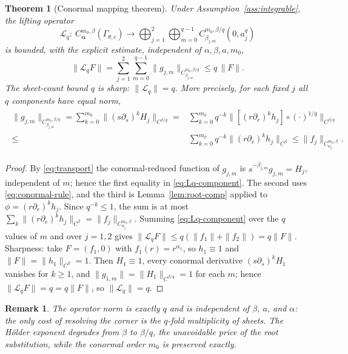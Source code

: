 \documentclass[pdflatex,sn-mathphys-num]{sn-jnl}%
\newcommand{\Gw}{\Gamma_{\theta,c}}
\newcommand{\bd}{\boldsymbol}
\newcommand{\Lq}{\mathcal{L}_{q}}
\theoremstyle{thmstyleone}
\newtheorem{theorem}{Theorem}
\theoremstyle{thmstyletwo}
\newtheorem{remark}{Remark}
\theoremstyle{thmstylethree}
\begin{document}
\begin{theorem}[Conormal mapping theorem]\label{thm:Lq-bounded}
Under Assumption~\ref{ass:integrable}, the lifting operator
\[
  \Lq:\ C^{m_0,\beta}_{\bd\alpha}(\Gw)
  \longrightarrow
  \bigoplus_{j=1}^{2}\bigoplus_{m=0}^{q-1}
     C^{m_0,\beta/q}_{\beta_{j,m}}(0,a_j^{q})
\]
is bounded, with the explicit estimate, independent of $\alpha,\beta,a,m_0$,
\begin{equation}\label{eq:Lq-bound}
  \|\Lq F\|
  =\sum_{j=1}^{2}\sum_{m=0}^{q-1}\|g_{j,m}\|_{C^{m_0,\beta/q}_{\beta_{j,m}}}
  \le q\,\|F\| .
\end{equation}
The sheet-count bound $q$ is sharp: $\|\Lq\|=q$.
More precisely, for each fixed $j$ all $q$ components have equal norm,
\begin{align}\label{eq:Lq-component}
\begin{aligned}
  \|g_{j,m}\|_{C^{m_0,\beta/q}_{\beta_{j,m}}}
  =\sum_{k=0}^{m_0}\bigl\|(s\partial_s)^{k}H_j\bigr\|_{C^{\beta/q}}
  =&\sum_{k=0}^{m_0}q^{-k}\bigl\|[(r\partial_r)^{k}h_j]\circ(\cdot)^{1/q}\bigr\|_{C^{\beta/q}} \\
  \le&\sum_{k=0}^{m_0}q^{-k}\bigl\|(r\partial_r)^{k}h_j\bigr\|_{C^{\beta}}
  \le\|f_j\|_{C^{m_0,\beta}_{\alpha_j}} .
\end{aligned}
\end{align}
\end{theorem}

\begin{proof}
By \eqref{eq:transport} the conormal-reduced function of $g_{j,m}$ is
$s^{-\beta_{j,m}}g_{j,m}=H_j$, independent of $m$; hence the first equality in
\eqref{eq:Lq-component}. The second uses \eqref{eq:conormal-rule}, and the third
is Lemma~\ref{lem:root-comp} applied to $\phi=(r\partial_r)^{k}h_j$. Since
$q^{-k}\le1$, the sum is at most $\sum_k\|(r\partial_r)^{k}h_j\|_{C^{\beta}}
=\|f_j\|_{C^{m_0,\beta}_{\alpha_j}}$. Summing \eqref{eq:Lq-component} over the
$q$ values of $m$ and over $j=1,2$ gives
$\|\Lq F\|\le q(\|f_1\|+\|f_2\|)=q\|F\|$. Sharpness: take $F=(f_1,0)$ with
$f_1(r)=r^{\alpha_1}$, so $h_1\equiv1$ and $\|F\|=\|h_1\|_{C^{\beta}}=1$. Then
$H_1\equiv1$, every conormal derivative $(s\partial_s)^{k}H_1$ vanishes for
$k\ge1$, and $\|g_{1,m}\|=\|H_1\|_{C^{\beta/q}}=1$ for each $m$; hence
$\|\Lq F\|=q=q\|F\|$, so $\|\Lq\|=q$.
\end{proof}

\begin{remark}
The operator norm is exactly $q$ and is independent of $\beta$, $a$, and
$\alpha$: the only cost of resolving the corner is the $q$-fold multiplicity of
sheets. The H\"older exponent degrades from $\beta$ to $\beta/q$, the
unavoidable price of the root substitution, while the conormal order $m_0$ is
preserved exactly.
\end{remark}
\end{document}
